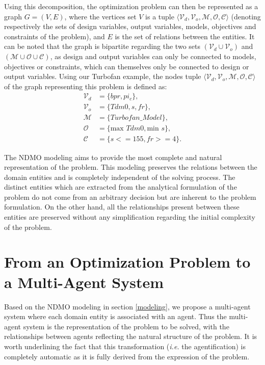 Using this decomposition, the optimization problem can then be represented as a graph $ G = (V, E)$, where the vertices set $V$ is a tuple $\langle \mathcal{V}_d, \mathcal{V}_o, \mathcal{M}, \mathcal{O}, \mathcal{C}\rangle$ (denoting respectively the sets of design variables, output variables, models, objectives and constraints of the problem), and $E$ is the set of relations between the entities. It can be noted that the graph is bipartite regarding the two sets $(\mathcal{V}_d \cup \mathcal{V}_o)$ and $(\mathcal{M} \cup \mathcal{O} \cup \mathcal{C})$, as design and output variables can only be connected to models, objectives or constraints, which can themselves only be connected to design or output variables.
Using our Turbofan example, the nodes tuple $\langle \mathcal{V}_d, \mathcal{V}_o, \mathcal{M}, \mathcal{O}, \mathcal{C}\rangle$ of the graph representing this problem is defined as:
\begin{align*}
	\mathcal{V}_d &= \{bpr, pi_c\}, \\
	\mathcal{V}_o &= \{Tdm0, s, fr\},\\
	\mathcal{M} &= \{Turbofan\_Model\},\\
	\mathcal{O} &= \{\text{max }Tdm0, \text{min }s\},\\
	\mathcal{C} &= \{s <= 155, fr >= 4\}.
\end{align*}

The NDMO modeling aims to provide the most complete and natural representation of the problem. This modeling preserves the relations between the domain entities and is completely independent of the solving process. The distinct entities which are extracted from the analytical formulation of the problem do not come from an arbitrary decision but are inherent to the problem formulation. On the other hand, all the relationships present between these entities are preserved without any simplification regarding the initial complexity of the problem.

\section{From an Optimization Problem to a Multi-Agent System}

Based on the NDMO modeling in section \ref{modeling}, we propose a multi-agent system where each domain entity is associated with an agent. Thus the multi-agent system is the representation of the problem to be solved, with the relationships between agents reflecting the natural structure of the problem. It is worth underlining the fact that this transformation (\textit{i.e.} the agentification) is completely automatic as it is fully derived from the expression of the problem.

